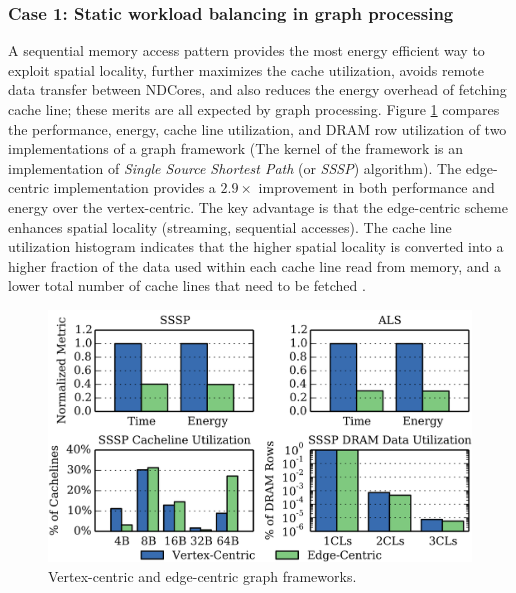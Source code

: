\documentclass[letterpaper, 11pt, conference, margin=1in]{ieeeconf}   %
\begin{document}
\subsubsection{\bf Case 1: Static workload balancing in graph processing}
A sequential memory access pattern provides the most energy efficient way to exploit spatial locality, further maximizes the cache utilization, avoids remote data transfer between NDCores, and also reduces the energy overhead of fetching cache line; these merits are all expected by graph processing. Figure \ref{fig:graph-vertex-edge} compares the performance, energy, cache line utilization, and DRAM row utilization of two implementations of a graph framework (The kernel of the framework is an implementation of \textit{Single Source Shortest Path} (or \textit{SSSP}) algorithm). The edge-centric implementation provides a $2.9\times$ improvement in both performance and energy over the vertex-centric. The key advantage is that the edge-centric scheme enhances spatial locality (streaming, sequential accesses). The cache line utilization histogram indicates that the higher spatial locality is converted into a higher fraction of the data used within each cache line read from memory, and a lower total number of cache lines that need to be fetched \cite{Gao2015}.

\begin{figure}[h]
  \centering
  \includegraphics[scale=0.29]{figures/ndc_graph_vertex_vs_edge.png}
  \caption{Vertex-centric and edge-centric graph frameworks. \cite{Gao2015}}
  \label{fig:graph-vertex-edge}
\end{figure}
\end{document}

